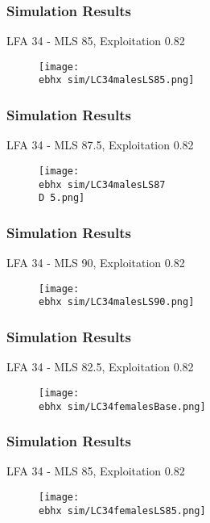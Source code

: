 \documentclass{beamer}
\newcommand{\ebhx}{\string~/bio.data/bio.lobster/figures/LFA3438Framework2019/figures/Brad/} %
\newcommand{\D}{.}
\begin{document}
\begin{frame}
\frametitle{Simulation Results}
LFA 34 - MLS 85, Exploitation 0.82
\begin{figure}
        \begin{center}
            \texttt{[image: \\ebhx sim/LC34malesLS85.png]}
        \end{center}
    \end{figure}
\end{frame}


\begin{frame}
\frametitle{Simulation Results}
LFA 34 - MLS 87.5, Exploitation 0.82
\begin{figure}
        \begin{center}
            \texttt{[image: \\ebhx sim/LC34malesLS87\\D 5.png]}
        \end{center}
    \end{figure}
\end{frame}


\begin{frame}
\frametitle{Simulation Results}
LFA 34 - MLS 90, Exploitation 0.82
\begin{figure}
        \begin{center}
            \texttt{[image: \\ebhx sim/LC34malesLS90.png]}
        \end{center}
    \end{figure}
\end{frame}




\begin{frame}
\frametitle{Simulation Results}
LFA 34 - MLS 82.5, Exploitation 0.82
\begin{figure}
        \begin{center}
            \texttt{[image: \\ebhx sim/LC34femalesBase.png]}
        \end{center}
    \end{figure}
\end{frame}



\begin{frame}
\frametitle{Simulation Results}
LFA 34 - MLS 85, Exploitation 0.82
\begin{figure}
        \begin{center}
            \texttt{[image: \\ebhx sim/LC34femalesLS85.png]}
        \end{center}
    \end{figure}
\end{frame}
\end{document}
